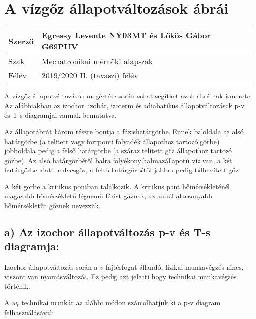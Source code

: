 \section*{A vízgőz állapotváltozások ábrái}


\begin{tabular}{ | p{2cm} | p{14cm} | } 
	\hline
	Szerző & Egressy Levente NY03MT és Lőkös Gábor G69PUV \\ 
	\hline
	Szak & Mechatronikai mérnöki alapszak \\ 
	\hline
	Félév & 2019/2020 II. (tavaszi) félév \\ 
	\hline
\end{tabular}
\vspace{0.5cm}


\noindent A vízgőz állapotváltozások megértése során sokat segíthet azok ábráinak ismerete. Az alábbiakban az izochor, izobár, izoterm és adiabatikus állapotváltozások p-v és T-s diagramjai vannak bemutatva.

Az állapotábrát három részre bontja a fázishatárgörbe. Ennek baloldala az alsó határgörbe (a telített vagy forrponti folyadék állapothoz tartozó görbe) jobboldala pedig a felső határgörbe (a száraz telített gőz állapothoz tartozó görbe). Az alsó határgörbétől balra folyékony halmazállapotú víz van, a két határgörbe alatt nedvesgőz, a felső határgörbétől jobbra pedig túlhevített gőz.

A két görbe a kritikus pontban találkozik. A kritikus pont hőmérsékleténél magasabb hőmérsékletű légnemű fázist gáznak, az annál alacsonyabb hőmérsékletűt gőznek nevezzük.


\subsection*{a) Az izochor állapotváltozás p-v és T-s diagramja:}

Izochor állapotváltozás során a $v$ fajtérfogat állandó, fizikai munkavégzés nincs, viszont van nyomásváltozás. Ez pedig azt jelenti hogy technikai munkavégzés történik.

A $w_t$ technikai munkát az alábbi módon számolhatjuk ki a p-v diagram felhasználásával:

